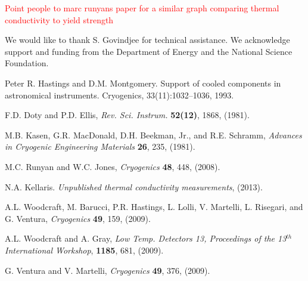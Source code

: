 \documentclass[final]{svjour2}
\begin{document}
\textcolor{red}{Point people to marc runyans paper for a similar graph comparing thermal conductivity to yield strength}

\begin{acknowledgements}
We would like to thank S. Govindjee for technical assistance. We acknowledge support and funding from the Department of Energy and the National Science Foundation.
\end{acknowledgements}

\begin{thebibliography}{99}

Peter R. Hastings and D.M. Montgomery. Support of cooled components in astronomical instruments. Cryogenics, 33(11):1032–1036, 1993.


F.D. Doty and P.D. Ellis, {\it Rev. Sci. Instrum.} \textbf{52(12)}, 1868, (1981).

M.B. Kasen, G.R. MacDonald, D.H. Beekman, Jr., and R.E. Schramm, {\it Advances in Cryogenic Engineering Materials} \textbf{26}, 235, (1981). 


M.C. Runyan and W.C. Jones, {\it Cryogenics} \textbf{48}, 448, (2008).

N.A. Kellaris. {\it Unpublished thermal conductivity measurements}, (2013).

A.L. Woodcraft, M. Barucci, P.R. Hastings, L. Lolli, V. Martelli, L. Risegari, and G. Ventura, {\it Cryogenics} \textbf{49}, 159, (2009).

A.L. Woodcraft and A. Gray, {\it Low Temp. Detectors 13, Proceedings of the 13$^{th}$ International Workshop}, \textbf{1185}, 681, (2009).

G. Ventura and V. Martelli, {\it Cryogenics} \textbf{49}, 376, (2009).

\end{thebibliography}
\end{document}
